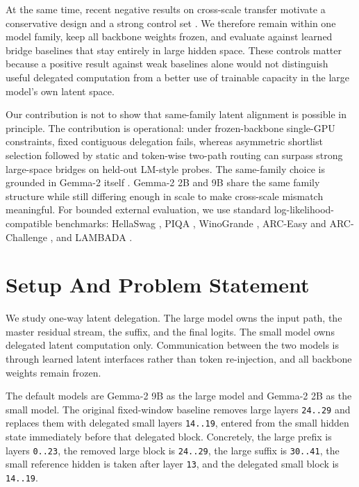\documentclass[11pt]{article}
\begin{document}
At the same time, recent negative results on cross-scale transfer motivate a conservative design and a strong control set \citep{tan2025incompatibility}. We therefore remain within one model family, keep all backbone weights frozen, and evaluate against learned bridge baselines that stay entirely in large hidden space. These controls matter because a positive result against weak baselines alone would not distinguish useful delegated computation from a better use of trainable capacity in the large model's own latent space.

Our contribution is not to show that same-family latent alignment is possible in principle. The contribution is operational: under frozen-backbone single-GPU constraints, fixed contiguous delegation fails, whereas asymmetric shortlist selection followed by static and token-wise two-path routing can surpass strong large-space bridges on held-out LM-style probes. The same-family choice is grounded in Gemma-2 itself \citep{gemmateam2024gemma2}. Gemma-2 2B and 9B share the same family structure while still differing enough in scale to make cross-scale mismatch meaningful. For bounded external evaluation, we use standard log-likelihood-compatible benchmarks: HellaSwag \citep{zellers2019hellaswag}, PIQA \citep{bisk2020piqa}, WinoGrande \citep{sakaguchi2020winogrande}, ARC-Easy and ARC-Challenge \citep{clark2018arc}, and LAMBADA \citep{paperno2016lambada}.

\section{Setup And Problem Statement}

We study one-way latent delegation. The large model owns the input path, the master residual stream, the suffix, and the final logits. The small model owns delegated latent computation only. Communication between the two models is through learned latent interfaces rather than token re-injection, and all backbone weights remain frozen.

The default models are Gemma-2 9B as the large model and Gemma-2 2B as the small model. The original fixed-window baseline removes large layers \texttt{24..29} and replaces them with delegated small layers \texttt{14..19}, entered from the small hidden state immediately before that delegated block. Concretely, the large prefix is layers \texttt{0..23}, the removed large block is \texttt{24..29}, the large suffix is \texttt{30..41}, the small reference hidden is taken after layer \texttt{13}, and the delegated small block is \texttt{14..19}.
\end{document}
